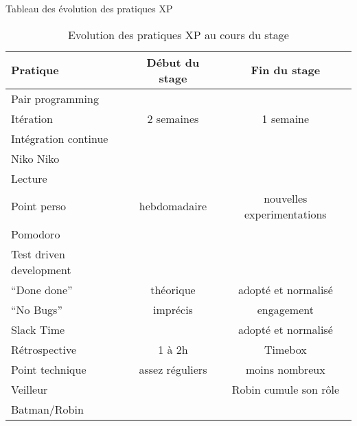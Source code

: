 Tableau des évolution des pratiques XP
\begin{table}[h]
	\caption{\label{Tableau:Evolution des pratiques XP au cours du stage}Evolution des pratiques XP au cours du stage}
	\begin{tabular}{|l|c|c|}
		\hline
		Pratique & Début du stage & Fin du stage\\
		\hline
		Pair programming & \tick & \tick \\
		Itération & 2 semaines & 1 semaine \\
		Intégration continue & \tick & \tick \\
		Niko Niko & \tick & \badtick \\
		Lecture & \tick & \badtick \\
		Point perso & hebdomadaire & nouvelles experimentations\\
		Pomodoro & \badtick & \tick \\
		Test driven development & \tick & \tick \\
		``Done done'' & théorique & adopté et normalisé\\
		``No Bugs'' & imprécis & engagement \\
		Slack Time & \badtick & adopté et normalisé\\
		Rétrospective & 1 à 2h & Timebox\\
		Point technique & assez réguliers & moins nombreux\\
		Veilleur & \tick & Robin cumule son rôle\\
		Batman/Robin & \badtick & \tick \\
		\hline
	\end{tabular}
\end{table}
